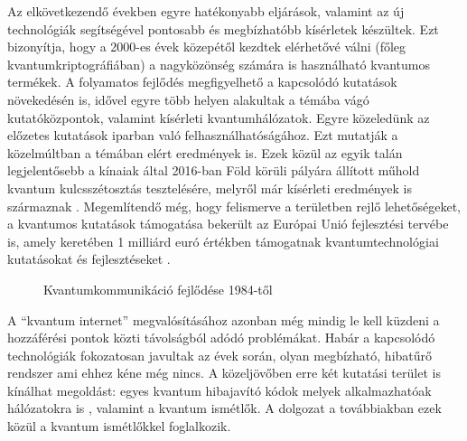  Az elkövetkezendő években egyre hatékonyabb eljárások, valamint az új technológiák segítségével pontosabb és megbízhatóbb kísérletek készültek. Ezt bizonyítja, hogy a 2000-es évek közepétől kezdtek elérhetővé válni (főleg kvantumkriptográfiában) a nagyközönség számára is használható kvantumos termékek. A folyamatos fejlődés megfigyelhető a kapcsolódó kutatások növekedésén is, idővel egyre több helyen alakultak a témába vágó kutatóközpontok, valamint kísérleti kvantumhálózatok. Egyre közeledünk az előzetes kutatások iparban való felhasználhatóságához. Ezt mutatják a közelmúltban a témában elért eredmények is. Ezek közül az egyik talán legjelentősebb a kínaiak által 2016-ban Föld körüli pályára állított műhold \cite{chinasat} kvantum kulcsszétosztás tesztelésére, melyről már kísérleti eredmények is származnak \cite{yin2017satellite}. Megemlítendő még, hogy felismerve a területben rejlő lehetőségeket, a kvantumos kutatások támogatása bekerült az Európai Unió fejlesztési tervébe is, amely keretében 1 milliárd euró értékben támogatnak kvantumtechnológiai kutatásokat és fejlesztéseket \cite{manifesto}.\\
 \begin{figure}[h]
\centering
{}
\caption[Kvantumkommunikáció timeline]{Kvantumkommunikáció fejlődése 1984-től}
\end{figure}
A ``kvantum internet'' \cite{kimble2008quantum}\cite{pirandola2016unite} megvalósításához azonban még mindig le kell küzdeni a hozzáférési pontok közti távolságból adódó problémákat. Habár a kapcsolódó technológiák fokozatosan javultak az évek során, olyan megbízható, hibatűrő rendszer ami ehhez kéne még nincs. A közeljövőben erre két kutatási terület is kínálhat megoldást: egyes kvantum hibajavító kódok \cite{lidar2013quantum} melyek alkalmazhatóak hálózatokra is \cite{zhang2013quantum}, valamint a kvantum ismétlők\cite{uphoff2016integrated}\cite{krovi2016practical}\cite{pfister2016quantum}\cite{li2016heralded}. A dolgozat a továbbiakban ezek közül a kvantum ismétlőkkel foglalkozik. 



